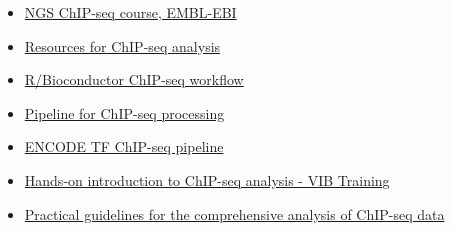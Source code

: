 \documentclass[]{article}
\providecommand{\tightlist}{%
  \setlength{\itemsep}{0pt}\setlength{\parskip}{0pt}}
\begin{document}
\begin{itemize}
\tightlist
\item
  \href{https://www.ebi.ac.uk/training/online/sites/ebi.ac.uk.training.online/files/user/18/private/chipseq_loos.pdf}{NGS
  ChIP-seq course, EMBL-EBI}
\item
  \href{https://github.com/crazyhottommy/ChIP-seq-analysis}{Resources
  for ChIP-seq analysis}
\item
  \href{http://biocluster.ucr.edu/~rkaundal/workshops/R_feb2016/ChIPseq/ChIPseq.html}{R/Bioconductor
  ChIP-seq workflow}
\item
  \href{https://github.com/shenlab-sinai/chip-seq_preprocess}{Pipeline
  for ChIP-seq processing}
\item
  \href{https://github.com/mforde84/ENCODE_TF_ChIP_pipeline}{ENCODE TF
  ChIP-seq pipeline}
\item
  \href{http://www.biologie.ens.fr/~mthomas/other/chip-seq-training/}{Hands-on
  introduction to ChIP-seq analysis - VIB Training}
\item
  \href{https://journals.plos.org/ploscompbiol/article?id=10.1371/journal.pcbi.1003326}{Practical
  guidelines for the comprehensive analysis of ChIP-seq data}
\end{itemize}
\end{document}
